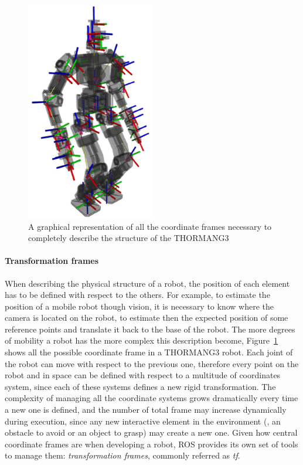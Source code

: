 \begin{figure}[t]
    \centering
    \includegraphics[width=0.5\textwidth]{gfx/ros/tf_frames}
    \caption{A graphical representation of all the coordinate frames necessary to completely describe the structure of the THORMANG3}\label{fig:ros-tf}
\end{figure}

\paragraph{Transformation frames} When describing the physical structure of a robot, the position of each element has to be defined with respect to the others. For example, to estimate the position of a mobile robot though vision, it is necessary to know where the camera is located on the robot, to estimate then the expected position of some reference points and translate it back to the base of the robot. The more degrees of mobility a robot has the more complex this description become, Figure~\ref{fig:ros-tf} shows all the possible coordinate frame in a THORMANG3 robot. Each joint of the robot can move with respect to the previous one, therefore every point on the robot and in space can be defined with respect to a multitude of coordinates system, since each of these systems defines a new rigid transformation. The complexity of managing all the coordinate systems grows dramatically every time a new one is defined, and the number of total frame may increase dynamically during execution, since any new interactive element in the environment (\eg, an obstacle to avoid or an object to grasp)  may create a new one. Given how central coordinate frames are when developing a robot, ROS provides its own set of tools to manage them: \textit{transformation frames}, commonly referred as \textit{tf}.

